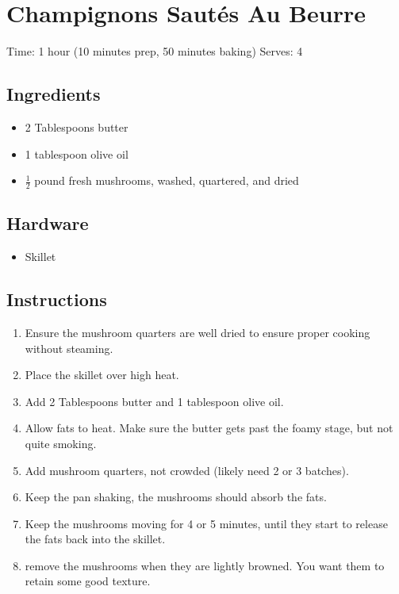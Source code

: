 \section{Champignons Sautés Au Beurre}
\label{champignonsSautesAuBeurre}
\setcounter{secnumdepth}{0}
Time: 1 hour (10 minutes prep, 50 minutes baking)
Serves: 4

\begin{multicols}{2}
\subsection*{Ingredients}
\begin{itemize}
    \item 2 Tablespoons butter
    \item 1 tablespoon olive oil
    \item \( \frac{1}{2} \) pound fresh mushrooms, washed, quartered, and dried
\end{itemize}

\subsection*{Hardware}
\begin{itemize}
    \item Skillet
\end{itemize}
\clearpage

\subsection*{Instructions}
\begin{enumerate}
    \item Ensure the mushroom quarters are well dried to ensure proper cooking without steaming.
    \item Place the skillet over high heat.
    \item Add 2 Tablespoons butter and 1 tablespoon olive oil.
    \item Allow fats to heat. Make sure the butter gets past the foamy stage, but not quite smoking.
    \item Add mushroom quarters, not crowded (likely need 2 or 3 batches).
    \item Keep the pan shaking, the mushrooms should absorb the fats.
    \item Keep the mushrooms moving for 4 or 5 minutes, until they start to release the fats back into the skillet.
    \item remove the mushrooms when they are lightly browned. You want them to retain some good texture.
\end{enumerate}


\end{multicols}
